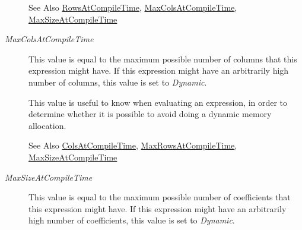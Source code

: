 \begin{Desc}
\begin{description}
\begin{DoxySeeAlso}{See Also}
\hyperlink{class_matrix_base_aaa53a8ec1bc1ba52b1e50631dac15d6da10c48c1361376cbd5ef62a18966f2691}{Rows\-At\-Compile\-Time}, \hyperlink{class_matrix_base_aaa53a8ec1bc1ba52b1e50631dac15d6da3e5f3bde791fd2f758a9f757e046b2ef}{Max\-Cols\-At\-Compile\-Time}, \hyperlink{class_matrix_base_aaa53a8ec1bc1ba52b1e50631dac15d6da15fbad694bf6920ef57fabc0cb3e56ea}{Max\-Size\-At\-Compile\-Time} 
\end{DoxySeeAlso}
\item[{\em 
\hypertarget{class_matrix_base_aaa53a8ec1bc1ba52b1e50631dac15d6da3e5f3bde791fd2f758a9f757e046b2ef}{Max\-Cols\-At\-Compile\-Time}\label{class_matrix_base_aaa53a8ec1bc1ba52b1e50631dac15d6da3e5f3bde791fd2f758a9f757e046b2ef}
}]This value is equal to the maximum possible number of columns that this expression might have. If this expression might have an arbitrarily high number of columns, this value is set to {\itshape Dynamic}.

This value is useful to know when evaluating an expression, in order to determine whether it is possible to avoid doing a dynamic memory allocation.

\begin{DoxySeeAlso}{See Also}
\hyperlink{class_matrix_base_aaa53a8ec1bc1ba52b1e50631dac15d6da359babfd1277ae780433d99b383e00e8}{Cols\-At\-Compile\-Time}, \hyperlink{class_matrix_base_aaa53a8ec1bc1ba52b1e50631dac15d6da73ed130d060f18903c34624ccb8c9894}{Max\-Rows\-At\-Compile\-Time}, \hyperlink{class_matrix_base_aaa53a8ec1bc1ba52b1e50631dac15d6da15fbad694bf6920ef57fabc0cb3e56ea}{Max\-Size\-At\-Compile\-Time} 
\end{DoxySeeAlso}
\item[{\em 
\hypertarget{class_matrix_base_aaa53a8ec1bc1ba52b1e50631dac15d6da15fbad694bf6920ef57fabc0cb3e56ea}{Max\-Size\-At\-Compile\-Time}\label{class_matrix_base_aaa53a8ec1bc1ba52b1e50631dac15d6da15fbad694bf6920ef57fabc0cb3e56ea}
}]This value is equal to the maximum possible number of coefficients that this expression might have. If this expression might have an arbitrarily high number of coefficients, this value is set to {\itshape Dynamic}.


\end{description}
\end{Desc}
